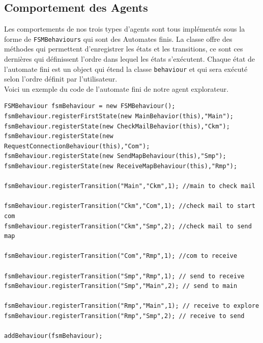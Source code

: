 \documentclass[10pt]{article}
\newcommand\tab[1][0.65cm]{\hspace*{#1}}
\begin{document}
	\subsection{Comportement des Agents}
	Les comportements de nos trois types d'agents sont tous implémentés sous la forme de \texttt{FSMBehaviours} qui sont des Automates finis. La classe offre des méthodes qui permettent d'enregistrer les états et les transitions, ce sont ces dernières qui définissent l'ordre dans lequel les états s'exécutent. Chaque état de l'automate fini est un object qui étend la classe \texttt{behaviour} et qui sera exécuté selon l'ordre définit par l'utilisateur.\\
\linebreak 
\tab Voici un exemple du code de l'automate fini de notre agent explorateur.
\begin{lstlisting}
FSMBehaviour fsmBehaviour = new FSMBehaviour();
fsmBehaviour.registerFirstState(new MainBehavior(this),"Main");
fsmBehaviour.registerState(new CheckMailBehavior(this),"Ckm");
fsmBehaviour.registerState(new RequestConnectionBehaviour(this),"Com");
fsmBehaviour.registerState(new SendMapBehaviour(this),"Smp");
fsmBehaviour.registerState(new ReceiveMapBehaviour(this),"Rmp");

fsmBehaviour.registerTransition("Main","Ckm",1); //main to check mail

fsmBehaviour.registerTransition("Ckm","Com",1); //check mail to start com
fsmBehaviour.registerTransition("Ckm","Smp",2); //check mail to send map

fsmBehaviour.registerTransition("Com","Rmp",1); //com to receive

fsmBehaviour.registerTransition("Smp","Rmp",1); // send to receive
fsmBehaviour.registerTransition("Smp","Main",2); // send to main

fsmBehaviour.registerTransition("Rmp","Main",1); // receive to explore
fsmBehaviour.registerTransition("Rmp","Smp",2); // receive to send

addBehaviour(fsmBehaviour);
\end{lstlisting}

\end{document}
